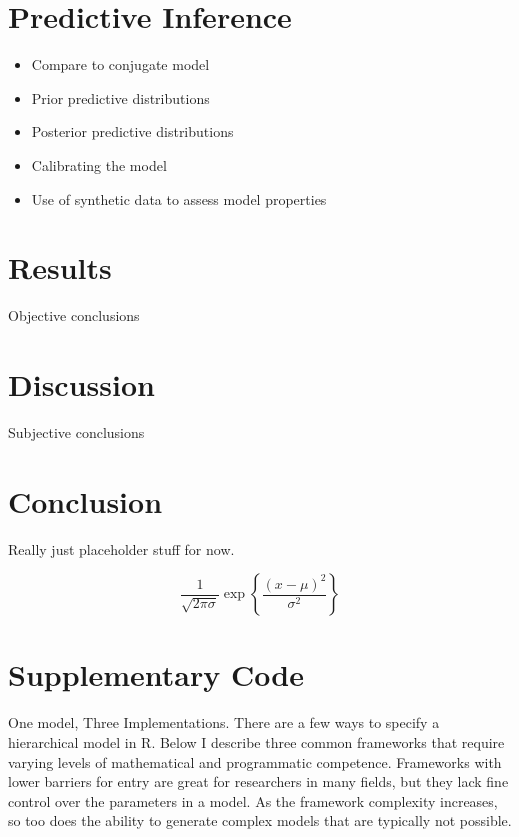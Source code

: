 \documentclass[11pt, oneside]{book}
\providecommand{\tightlist}{%
  \setlength{\itemsep}{0pt}\setlength{\parskip}{0pt}}
\begin{document}
\hypertarget{predictive-inference}{%
\chapter{Predictive Inference}\label{predictive-inference}}

\begin{itemize}
\tightlist
\item
  Compare to conjugate model
\item
  Prior predictive distributions
\item
  Posterior predictive distributions
\item
  Calibrating the model
\item
  Use of synthetic data to assess model properties
\end{itemize}

\hypertarget{results}{%
\chapter{Results}\label{results}}

Objective conclusions

\hypertarget{discussion}{%
\chapter{Discussion}\label{discussion}}

Subjective conclusions

\hypertarget{conclusion}{%
\chapter{Conclusion}\label{conclusion}}

Really just placeholder stuff for now.

\[
\frac{1}{\sqrt{2\pi\sigma}} \exp{\left\lbrace \frac{(x-\mu)^2}{\sigma^2} \right\rbrace}
\]

\hypertarget{appendix-appendix}{%
\appendix}


\hypertarget{supplementary-code}{%
\chapter{Supplementary Code}\label{supplementary-code}}

One model, Three Implementations. There are a few ways to specify a hierarchical model in R. Below I describe three common frameworks that require varying levels of mathematical and programmatic competence. Frameworks with lower barriers for entry are great for researchers in many fields, but they lack fine control over the parameters in a model. As the framework complexity increases, so too does the ability to generate complex models that are typically not possible.
\end{document}
